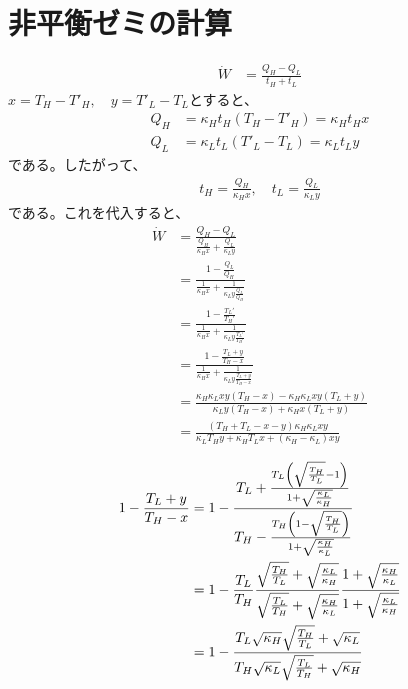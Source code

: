 \documentclass[a4paper,11pt]{jsarticle}
\numberwithin{equation}{section}
\begin{document}
\section{非平衡ゼミの計算}
\begin{align}
  \dot{W} &= \frac{Q_{H} - Q_{L}}{t_{H} + t_{L}}
\end{align}
$x = T_{H} - T'_{H},\quad y = T'_{L} - T_{L}$とすると、
\begin{align}
  Q_{H} &= \kappa_{H}t_{H}(T_{H}-T'_{H}) = \kappa_{H}t_{H}x\\
  Q_{L} &= \kappa_{L}t_{L}(T'_{L}-T_{L}) = \kappa_{L}t_{L}y
\end{align}
である。したがって、
\begin{align}
  t_{H} = \frac{Q_{H}}{\kappa_{H}x},\quad t_{L} = \frac{Q_{L}}{\kappa_{L}y}
\end{align}
である。これを代入すると、
\begin{align}
  \dot{W} &= \frac{Q_{H} - Q_{L}}{\frac{Q_{H}}{\kappa_{H}x} + \frac{Q_{L}}{\kappa_{L}y}}\\
  &= \frac{1-\frac{Q_{L}}{Q_{H}}}{\frac{1}{\kappa_{H}x} + \frac{1}{\kappa_{L}y\frac{Q_{L}}{Q_{H}}}}\\
  &= \frac{1-\frac{T_{L}'}{T_{H}'}}{\frac{1}{\kappa_{H}x} + \frac{1}{\kappa_{L}y\frac{T_{L}'}{T_{H}'}}}\\
  &= \frac{1-\frac{T_{L}+y}{T_{H}-x}}{\frac{1}{\kappa_{H}x} + \frac{1}{\kappa_{L}y\frac{T_{L}+y}{T_{H}-x}}}\\
  &= \frac{\kappa_{H}\kappa_{L}xy(T_{H}-x)-\kappa_{H}\kappa_{L}xy(T_{L}+y)}{\kappa_{L}y(T_{H}-x)+\kappa_{H}x(T_{L}+y)}\\
  &= \frac{(T_H + T_L - x - y)\kappa_H \kappa_L xy}{\kappa_L T_H y + \kappa_H T_L x + (\kappa_H - \kappa_L) xy}
\end{align}

\begin{align}
  1-\frac{T_{L}+y}{T_{H}-x} &= 1-\frac{T_L + \frac{T_{L}\qty(\sqrt{\frac{T_{H}}{T_{L}}}-1)}{1+\sqrt{\frac{\kappa_{L}}{\kappa_{H}}}}}{T_H - \frac{T_H\qty(1-\sqrt{\frac{T_{H}}{T_{L}}})}{1+\sqrt{\frac{\kappa_{H}}{\kappa_{L}}}}}\\
  &= 1-\frac{T_L}{T_H} \frac{\sqrt{\frac{T_H}{T_L}} + \sqrt{\frac{\kappa_{L}}{\kappa_{H}}}}{\sqrt{\frac{T_L}{T_H}} + \sqrt{\frac{\kappa_{H}}{\kappa_{L}}} } \frac{1 + \sqrt{\frac{\kappa_{H}}{\kappa_{L}}}}{1 + \sqrt{\frac{\kappa_{L}}{\kappa_{H}}}}\\
  &= 1 - \frac{T_L \sqrt{\kappa_H} \sqrt{\frac{T_H}{T_L}} + \sqrt{\kappa_L}}{T_H \sqrt{\kappa_L} \sqrt{\frac{T_L}{T_H}} + \sqrt{\kappa_H}}
\end{align}
\end{document}
